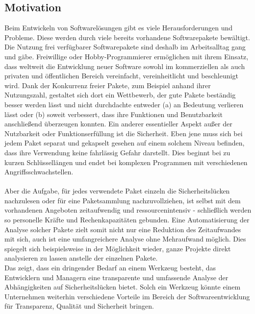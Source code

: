 \subsection{Motivation} \label{subsec:Motivation}
    Beim Entwickeln von Softwarelösungen gibt es viele Herausforderungen und Probleme. 
    Diese werden durch viele bereits vorhandene Softwarepakete bewältigt.
    Die Nutzung frei verfügbarer Softwarepakete sind deshalb im Arbeitsalltag gang und gäbe.
    Freiwillige oder Hobby-Programmierer ermöglichen mit ihrem Einsatz, dass weltweit die Entwicklung neuer Software sowohl im kommerziellen als auch privaten und öffentlichen Bereich vereinfacht, vereinheitlicht und beschleunigt wird.
    Dank der Konkurrenz freier Pakete, zum Beispiel anhand ihrer Nutzungszahl, gestaltet sich dort ein Wettbewerb, der gute Pakete beständig besser werden lässt und nicht durchdachte entweder (a) an Bedeutung verlieren lässt oder (b) soweit verbessert, dass ihre Funktionen und Benutzbarkeit anschließend überzeugen konnten.
    Ein anderer essentieller Aspekt außer der Nutzbarkeit oder Funktionserfüllung ist die Sicherheit.
    Eben jene muss sich bei jedem Paket separat und gekapselt gesehen auf einem solchem Niveau befinden, dass ihre Verwendung keine fahrlässig Gefahr darstellt.
    Dies beginnt bei zu kurzen Schlüssellängen und endet bei komplexen Programmen mit verschiedenen Angriffsschwachstellen.
    \\ \\
    Aber die Aufgabe, für jedes verwendete Paket einzeln die Sicherheitslücken nachzulesen oder für eine Paketsammlung nachzuvollziehen, ist selbst mit dem vorhandenen Angeboten zeitaufwendig und ressourcenintensiv - schließlich werden so personelle Kräfte und Rechenkapazitäten gebunden.
    Eine Automatisierung der Analyse solcher Pakete zielt somit nicht nur eine Reduktion des Zeitaufwandes mit sich, auch ist eine umfangreichere Analyse ohne Mehraufwand möglich.
    Dies spiegelt sich beispielsweise in der Möglichkeit wieder, ganze Projekte direkt analysieren zu lassen anstelle der einzelnen Pakete.
    \\
    Das zeigt, dass ein dringender Bedarf an einem Werkzeug besteht, das Entwicklern und Managern eine transparente und umfassende Analyse der Abhängigkeiten auf Sicherheitslücken bietet.
    Solch ein Werkzeug könnte einem Unternehmen weiterhin verschiedene Vorteile im Bereich der Softwareentwicklung für Transparenz, Qualität und Sicherheit bringen.
